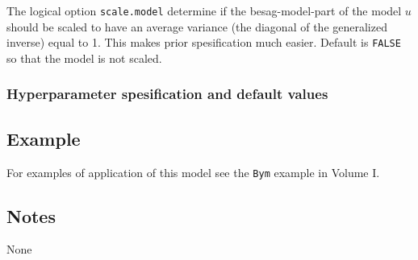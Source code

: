 \documentclass[a4paper,11pt]{article}
\begin{document}
The logical option \verb|scale.model| determine if the
besag-model-part of the model $u$ should be scaled to have an average
variance (the diagonal of the generalized inverse) equal to 1. This
makes prior spesification much easier. Default is \verb|FALSE| so that
the model is not scaled.


\subsubsection*{Hyperparameter spesification and default values}



\subsection*{Example}

For examples of application of this model see the {\tt Bym} example in
Volume I.

\subsection*{Notes}

None
\end{document}
